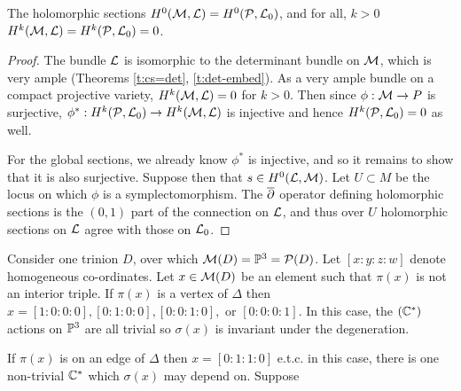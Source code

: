 \begin{theorem}
	The holomorphic sections $H^0(\mathcal{M},\mathcal{L}) = H^0(\mathcal{P}, \mathcal{L}_0)$, and for all, $k>0$ $H^k(\mathcal{M},\mathcal{L}) = H^k(\mathcal{P},\mathcal{L}_0) = 0$.
\end{theorem}
\begin{proof}
	The bundle $\mathcal{L}$ is isomorphic to the determinant bundle on $\mathcal{M}$, which is very ample (Theorems \ref{t:cs=det}, \ref{t:det-embed}). As a very ample bundle on a compact projective variety, $H^k(\mathcal{M},\mathcal{L}) = 0$ for $k>0$. Then since $\phi:\mathcal{M}\to P$ is surjective, $\phi^\ast:H^k(\mathcal{P},\mathcal{L}_0)\to H^k(\mathcal{M},\mathcal{L})$ is injective and hence $H^k(\mathcal{P},\mathcal{L}_0) =0$ as well.
	
	For the global sections, we already know $\phi^\ast$ is injective, and so it remains to show that it is also surjective. Suppose then that $s\in H^0(\mathcal{L},\mathcal{M})$. Let $U \subset M$ be the locus on which $\phi$ is a symplectomorphism. The $\overline{\partial}$ operator defining holomorphic sections is the $(0,1)$ part of the connection on $\mathcal{L}$, and thus over $U$ holomorphic sections on $\mathcal{L}$ agree with those on $\mathcal{L}_0$.  
\end{proof}

Consider one trinion $D$, over which $\mathcal{M}(D) = \mathbb{P}^3 = \mathcal{P}(D)$. Let $[x:y:z:w]$ denote homogeneous co-ordinates. Let $x\in \mathcal{M}(D)$ be an element such that $\pi(x)$ is not an interior triple. If $\pi(x)$ is a vertex of $\Delta$ then $x = [1:0:0:0], [0:1:0:0], [0:0:1:0],$ or  $[0:0:0:1]$. In this case, the $(\mathbb{C}^\ast)$ actions on $\mathbb{P}^3$ are all trivial so $\sigma(x)$ is invariant under the degeneration.

If $\pi(x)$ is on an edge of $\Delta$ then $x = [0:1:1:0]$ e.t.c. in this case, there is one non-trivial $\mathbb{C}^\ast$ which $\sigma(x)$ may depend on. Suppose 


